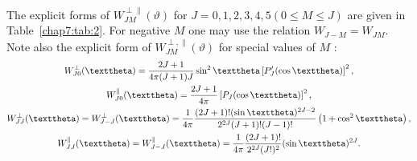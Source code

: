 The explicit forms of $W_{J M}^{\perp \|}(\vartheta)$ for $J=0,1,2,3,4,5(0 \leq M \leq J)$ are given in Table~\ref{chap7:tab:2}. For negative $M$ one may use the relation $W_{J-M}=W_{J M}$. Note also the explicit form of $W_{J M}^{\perp, \|}(\vartheta)$ for special values of $M$ :
\begin{gather}
W_{J 0}^{\perp}(\vartheta)=\frac{2 J+1}{4 \pi(J+1) J} \sin ^{2} \vartheta\left[P_{J}^{\prime}(\cos \vartheta)\right]^{2},  \label{eq:7:3:168}\\
W_{J 0}^{\|}(\vartheta)=\frac{2 J+1}{4 \pi}\left[P_{J}(\cos \vartheta)\right]^{2} , \notag\\
W_{J J}^{\perp}(\vartheta)=W_{J-J}^{\perp}(\vartheta)=\frac{1}{4 \pi} \frac{(2 J+1)!(\sin \vartheta)^{2 J-2}}{2^{2 J}(J+1)!(J-1)!}\left(1+\cos ^{2} \vartheta\right) , \notag\\
W_{J J}^{\|}(\vartheta)=W_{J-J}^{\|}(\vartheta)=\frac{1}{4 \pi} \frac{(2 J+1)!}{2^{2 J}(J!)^{2}}(\sin \vartheta)^{2 J}. \label{eq:7:3:169}
\end{gather}
